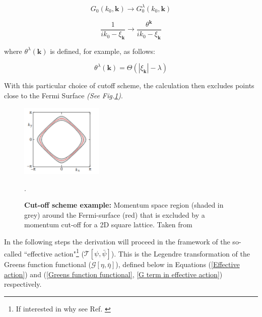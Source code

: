 \documentclass[12pt]{article}
\begin{document}
\begin{equation} \label{propagator transform 1}
    G_0(k_0, \textbf{k}) \rightarrow G_0^{\lambda}(k_0, \textbf{k})
\end{equation}


\begin{equation} \label{propagator transform 2}
    \frac{1}{ik_0 - \xi_{\textbf{k}}} \rightarrow \frac{\theta^{\textbf{k}}}{ik_0 - \xi_{\textbf{k}}}
\end{equation}

\noindent where $\theta^{\lambda}(\textbf{k})$ is defined, for example, as follows:

\begin{equation} \label{theta def}
    \theta^{\lambda}(\textbf{k}) = \Theta(|\xi_{\textbf{k}}| - \lambda)    
\end{equation}

\noindent With this particular choice of cutoff scheme, the calculation then excludes points close to the Fermi Surface \textit{(See Fig.\ref{fig:Truncation})}. \par
\begin{figure}[htbp]  %
    \centering
    \includegraphics[width=0.35\textwidth]{Truncation.png}  %
    \caption{\textbf{Cut-off scheme example:} Momentum space region (shaded in grey) around the Fermi-surface (red) that is excluded 
    by a momentum cut-off for a 2D square lattice. Taken from \cite {metzner2012functional}}.
    \label{fig:Truncation}
\end{figure}

\medskip
\noindent In the following steps the derivation will proceed in the framework of the  so-called ``effective action"\footnote{If interested in why see Ref. \cite{metzner2012functional}}  ($\mathcal{T}[\psi, \bar{\psi}]$).
This is the Legendre transformation of the Greens function functional ($\mathcal{G}[\eta, \bar{\eta}]$), defined below in Equations (\ref{Effective action})  and  (\ref{Greens function functional}, \ref{G term in effective action}) respectively. 
\end{document}
